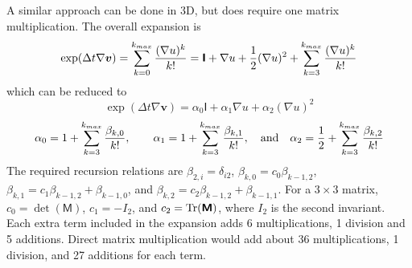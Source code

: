 \documentclass[11pt]{article}
\renewcommand{\vec}[1]{\boldsymbol{#1}}
\newcommand{\tens}[1]{\boldsymbol{\mathsf{#1}}}
\begin{document}
A similar approach can be done in 3D, but does require one matrix multiplication. The overall expansion is
\begin{equation}
    \exp(\Delta t \nabla\vec v) = \sum_{k=0}^{k_{max}} {(\nabla u)^k \over k!} 
            = \tens I + \nabla u + {1\over 2}(\nabla u)^2 + \sum_{k=3}^{k_{max}} {(\nabla u)^k \over k!}
\end{equation}
which can be reduced to
\begin{equation}
    \exp(\Delta t \nabla\vec v) = \alpha_0\tens I + \alpha_1\nabla u + \alpha_2(\nabla u)^2
\end{equation}
\begin{equation}
      \alpha_0 = 1 + \sum_{k=3}^{k_{max}} {\beta_{k,0}\over k!}, \qquad
      \alpha_1 = 1 + \sum_{k=3}^{k_{max}} {\beta_{k,1}\over k!}, \quad {\rm and} \quad
      \alpha_2 = {1\over 2} + \sum_{k=3}^{k_{max}} {\beta_{k,2}\over k!}
\end{equation}
The required recursion relations are $\beta_{2,i} = \delta_{i2}$, $\beta_{k,0}=c_0\beta_{k-1,2}$, $\beta_{k,1}=c_1\beta_{k-1,2} + \beta_{k-1,0}$, and $\beta_{k,2}=c_2\beta_{k-1,2} + \beta_{k-1,1}$. For a $3\times3$ matrix, $c_0 = \det(\tens M)$, $c_1 = -I_2$, and $c_2 = {\rm Tr}(\tens M)$, where $I_2$ is the second invariant. Each extra term included in the expansion adds 6 multiplications, 1 division and 5 additions. Direct matrix multiplication would add about 36 multiplications, 1 division, and 27 additions for each term.
\end{document}
